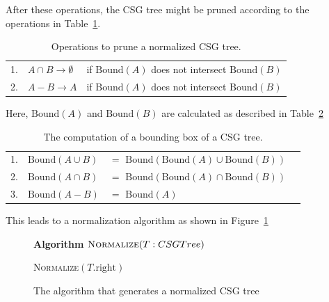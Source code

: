\documentclass[a4paper,10pt,twoside]{report}
\newcommand{\Bound}{\mbox{Bound}}
\begin{document}
    After these operations, the CSG tree might be pruned according to the operations in Table~\ref{table:prune}.\\
    \begin{table}[h]
        \begin{longtable}{lll}
            1. & $A \cap B \rightarrow \emptyset$ & if $\Bound(A)$ does not intersect $\Bound(B)$\\
            2. & $A - B \rightarrow A$            & if $\Bound(A)$ does not intersect $\Bound(B)$\\
        \end{longtable}
        \caption{Operations to prune a normalized CSG tree.}
        \label{table:prune}
    \end{table}
    
    Here, $\Bound(A)$ and $\Bound(B)$ are calculated as described in Table~\ref{table:bounding_box}\\
    \begin{table}[h]
        \begin{longtable}{llll}
            1. & $\Bound(A \cup B)$ & $=$ $\Bound(\Bound(A) \cup \Bound(B))$\\
            2. & $\Bound(A \cap B)$ & $=$ $\Bound(\Bound(A) \cap \Bound(B))$\\
            3. & $\Bound(A - B)$    & $=$ $\Bound(A)$\\
        \end{longtable}
        \caption{The computation of a bounding box of a CSG tree.}
        \label{table:bounding_box}
    \end{table}
    
    This leads to a normalization algorithm as shown in Figure~\ref{figure:algorithm}\\
    \begin{figure}[h]
            \textbf{Algorithm} $\textsc{Normalize}(T: CSGTree)$\\
            \noindent
            \begin{algorithm}[H]
                \BlankLine
                \BlankLine
                \textsc{Normalize}$(T\mbox{.right})$\;
            \end{algorithm}
        \caption{The algorithm that generates a normalized CSG tree}
        \label{figure:algorithm}
    \end{figure}
    
\end{document}
